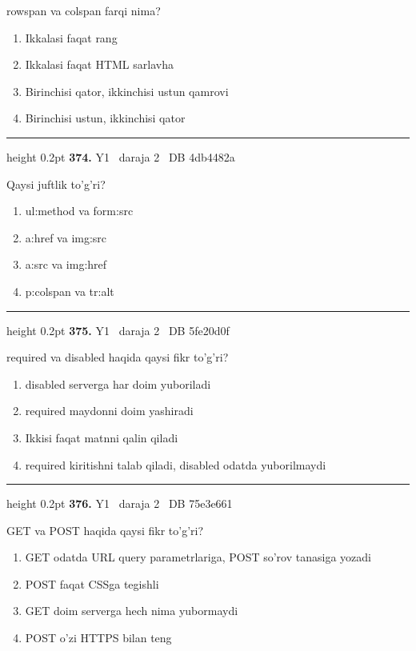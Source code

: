 \documentclass[10pt,a4paper,oneside]{article}
\begin{document}
\par
rowspan va colspan farqi nima?
\begin{enumerate}[label=\Alph*),leftmargin=9mm]
\item Ikkalasi faqat rang
\item Ikkalasi faqat HTML sarlavha
\item Birinchisi qator, ikkinchisi ustun qamrovi
\item Birinchisi ustun, ikkinchisi qator
\end{enumerate}
\vspace{2mm}\hrule height 0.2pt \vspace{4mm}
\hypertarget{q374}{\textbf{\color{ink}374.}}  {\color{muted}\scriptsize Y1 \textbullet\ daraja 2 \textbullet\ DB 4db4482a}
\par
Qaysi juftlik to'g'ri?
\begin{enumerate}[label=\Alph*),leftmargin=9mm]
\item ul:method va form:src
\item a:href va img:src
\item a:src va img:href
\item p:colspan va tr:alt
\end{enumerate}
\vspace{2mm}\hrule height 0.2pt \vspace{4mm}
\hypertarget{q375}{\textbf{\color{ink}375.}}  {\color{muted}\scriptsize Y1 \textbullet\ daraja 2 \textbullet\ DB 5fe20d0f}
\par
required va disabled haqida qaysi fikr to'g'ri?
\begin{enumerate}[label=\Alph*),leftmargin=9mm]
\item disabled serverga har doim yuboriladi
\item required maydonni doim yashiradi
\item Ikkisi faqat matnni qalin qiladi
\item required kiritishni talab qiladi, disabled odatda yuborilmaydi
\end{enumerate}
\vspace{2mm}\hrule height 0.2pt \vspace{4mm}
\hypertarget{q376}{\textbf{\color{ink}376.}}  {\color{muted}\scriptsize Y1 \textbullet\ daraja 2 \textbullet\ DB 75e3e661}
\par
GET va POST haqida qaysi fikr to'g'ri?
\begin{enumerate}[label=\Alph*),leftmargin=9mm]
\item GET odatda URL query parametrlariga, POST so'rov tanasiga yozadi
\item POST faqat CSSga tegishli
\item GET doim serverga hech nima yubormaydi
\item POST o'zi HTTPS bilan teng
\end{enumerate}
\end{document}
